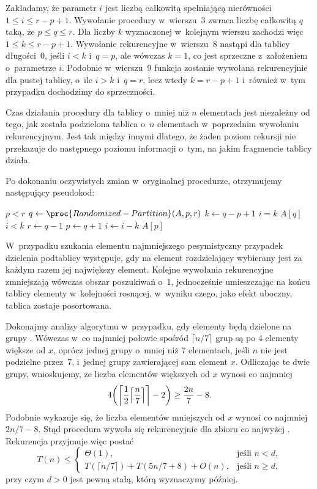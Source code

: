 \exercise %
Zakładamy, że parametr $i$ jest liczbą całkowitą spełniającą nierówności $1\le i\le r-p+1$. Wywołanie procedury  w~wierszu~3 zwraca liczbę całkowitą $q$ taką, że $p\le q\le r$. Dla liczby $k$ wyznaczonej w~kolejnym wierszu zachodzi więc $1\le k\le r-p+1$. Wywołanie rekurencyjne w~wierszu~8 nastąpi dla tablicy długości~0, jeśli $i<k$ i~$q=p$, ale wówczas $k=1$, co jest sprzeczne z~założeniem o~parametrze $i$. Podobnie w~wierszu~9 funkcja zostanie wywołana rekurencyjnie dla pustej tablicy, o~ile $i>k$ i~$q=r$, lecz wtedy $k=r-p+1$ i~również w~tym przypadku dochodzimy do sprzeczności.

\exercise %
Czas działania procedury  dla tablicy o~mniej niż $n$ elementach jest niezależny od tego, jak została podzielona tablica o~$n$ elementach w~poprzednim wywołaniu rekurencyjnym. Jest tak między innymi dlatego, że żaden poziom rekursji nie przekazuje do następnego poziomu informacji o~tym, na jakim fragmencie tablicy działa.

\exercise %
Po dokonaniu oczywistych zmian w~oryginalnej procedurze, otrzymujemy następujący pseudokod:
\begin{codebox}
\li	\While $p<r$
\li		\Do
			$q\gets\proc{Randomized-Partition}(A,p,r)$
\li			$k\gets q-p+1$
\li			\If $i=k$
\li				\Then \Return $A[q]$
				\End
\li			\If $i<k$
\li				\Then $r\gets q-1$
\li				\Else
					$p\gets q+1$
\li					$i\gets i-k$
				\End
		\End
\li	\Return $A[p]$
\end{codebox}

\exercise %
W~przypadku szukania elementu najmniejszego pesymistyczny przypadek dzielenia podtablicy występuje, gdy na element rozdzielający wybierany jest za każdym razem jej największy element. Kolejne wywołania rekurencyjne zmniejszają wówczas obszar poszukiwań o~1, jednocześnie umieszczając na końcu tablicy elementy w~kolejności rosnącej, w~wyniku czego, jako efekt uboczny, tablica zostaje posortowana.


\exercise %
Dokonajmy analizy algorytmu  w~przypadku, gdy elementy będą dzielone na grupy . Wówczas w~co najmniej połowie spośród $\lceil n/7\rceil$ grup są po 4 elementy większe od $x$, oprócz jednej grupy o~mniej niż 7 elementach, jeśli $n$ nie jest podzielne przez~7, i~jednej grupy zawierającej sam element $x$. Odliczając te dwie grupy, wnioskujemy, że liczba elementów większych od $x$ wynosi co najmniej
\[
	4\biggl(\biggl\lceil\frac{1}{2}\Bigl\lceil\frac{n}{7}\Bigr\rceil\biggr\rceil-2\biggr) \ge \frac{2n}{7}-8.
\]
Podobnie wykazuje się, że liczba elementów mniejszych od $x$ wynosi co najmniej $2n/7-8$. Stąd procedura wywoła się rekurencyjnie dla zbioru co najwyżej . Rekurencja przyjmuje więc postać
\[
	T(n) \le \begin{cases}
		\Theta(1), & \text{jeśli $n<d$}, \\
		T(\lceil n/7\rceil)+T(5n/7+8)+O(n), & \text{jeśli $n\ge d$},
	\end{cases}
\]
przy czym $d>0$ jest pewną stałą, którą wyznaczymy później.

